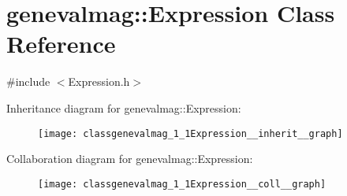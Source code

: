 \hypertarget{classgenevalmag_1_1Expression}{
\section{genevalmag::Expression Class Reference}
\label{classgenevalmag_1_1Expression}
}


{\ttfamily \#include $<$Expression.h$>$}



Inheritance diagram for genevalmag::Expression:\nopagebreak
\begin{figure}[H]
\begin{center}
\leavevmode
\texttt{[image: classgenevalmag\_1\_1Expression\_\_inherit\_\_graph]}
\end{center}
\end{figure}


Collaboration diagram for genevalmag::Expression:\nopagebreak
\begin{figure}[H]
\begin{center}
\leavevmode
\texttt{[image: classgenevalmag\_1\_1Expression\_\_coll\_\_graph]}
\end{center}
\end{figure}

